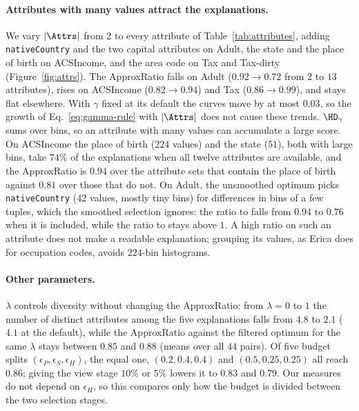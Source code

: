 \paragraph{Attributes with many values attract the explanations.}
\label{subsec:attrs}
We vary $|\Attrs|$ from $2$ to every attribute of Table~\ref{tab:attributes}, adding \texttt{nativeCountry} and the two capital attributes on Adult, the state and the place of birth on ACSIncome, and the area code on Tax and Tax-dirty (Figure~\ref{fig:attrs}).
The ApproxRatio falls on Adult ($0.92\rightarrow0.72$ from $2$ to $13$ attributes), rises on ACSIncome ($0.82\rightarrow0.94$) and Tax ($0.86\rightarrow0.99$), and stays flat elsewhere.
With $\gamma$ fixed at its default the curves move by at most $0.03$, so the growth of Eq.~\eqref{eq:gamma-rule} with $|\Attrs|$ does not cause these trends.
$\HD_\gamma$ sums over bins, so an attribute with many values can accumulate a large score.
On ACSIncome the place of birth ($224$ values) and the state ($51$), both with large bins, take $74\%$ of the explanations when all twelve attributes are available, and the ApproxRatio is $0.94$ over the attribute sets that contain the place of birth against $0.81$ over those that do not.
On Adult, the unsmoothed optimum picks \texttt{nativeCountry} ($42$ values, mostly tiny bins) for differences in bins of a few tuples, which the smoothed selection ignores: the ratio to \Bthree{} falls from $0.94$ to $0.76$ when it is included, while the ratio to \Bone{} stays above $1$.
A high ratio on such an attribute does not make a readable explanation; grouping its values, as Erica does for occupation codes, avoids $224$-bin histograms.

\paragraph{Other parameters.}
$\lambda$ controls diversity without changing the ApproxRatio: from $\lambda=0$ to $1$ the number of distinct attributes among the five explanations falls from $4.8$ to $2.1$ ($4.1$ at the default), while the ApproxRatio against the filtered optimum for the same $\lambda$ stays between $0.85$ and $0.88$ (means over all $44$ pairs).
Of five budget splits $(\epsilon_P,\epsilon_S,\epsilon_H)$, the equal one, $(0.2,0.4,0.4)$ and $(0.5,0.25,0.25)$ all reach $0.86$; giving the view stage $10\%$ or $5\%$ lowers it to $0.83$ and $0.79$.
Our measures do not depend on $\epsilon_H$, so this compares only how the budget is divided between the two selection stages.

